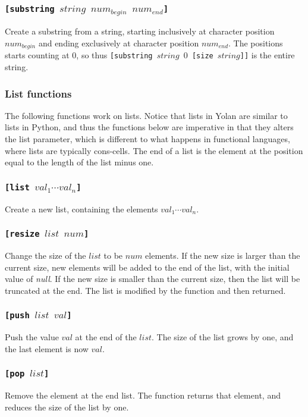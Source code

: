 \documentclass[11pt]{report}
\begin{document}
\subsubsection*{\tt{[substring }$string$ $num_{begin}$ $num_{end}$\tt{]}}
Create a substring from a string, starting inclusively at character position $num_{begin}$ and ending exclusively at character position $num_{end}$. The positions starts counting at $0$, so thus {\tt{[substring }$string$ $0$ \tt{[size }$string$\tt{]]}} is the entire string.

\subsubsection{List functions}
The following functions work on lists. Notice that lists in Yolan are similar to lists in Python, and thus the functions below are imperative in that they alters the list parameter, which is different to what happens in functional languages, where lists are typically cons-cells. The end of a list is the element at the position equal to the length of the list minus one.

\subsubsection*{\tt{[list }$val_1\cdots val_n$\tt{]}}
Create a new list, containing the elements $val_1\cdots val_n$.

\subsubsection*{\tt{[resize }$list$ $num$\tt{]}}
Change the size of the $list$ to be $num$ elements. 
If the new size is larger than the current size, new elements will be added to the end of the list, with the initial value of \textit{null}. If the new size is smaller than the current size, then the list will be truncated at the end. The list is modified by the function and then returned.

\subsubsection*{\tt{[push }$list$ $val$\tt{]}}
Push the value $val$ at the end of the $list$. The size of the list grows by one, and the last element is now $val$.

\subsubsection*{\tt{[pop }$list$\tt{]}}
Remove the element at the end list. The function returns that element, and reduces the size of the list by one.
\end{document}
